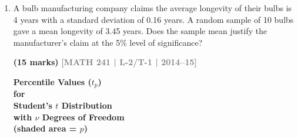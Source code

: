\documentclass[12pt,a4paper]{article}
\newcommand{\yr}[1]{\hfill\textcolor{gray}{\small\textbf{[#1]}}}
\newcommand{\mk}[1]{\textcolor{orange!70!black}{\small\textbf{(#1 marks)}}}
\begin{document}
\begin{enumerate}
\item A bulb manufacturing company claims the average longevity of their bulbs is 4 years with a standard deviation of 0.16 years. A random sample of 10 bulbs gave a mean longevity of 3.45 years. Does the sample mean justify the manufacturer's claim at the 5\% level of significance?

\mk{15} \yr{MATH 241 | L-2/T-1 | 2014--15}


\begin{center}
\begin{minipage}{0.45\textwidth}
    \centering
    \textbf{\large Percentile Values ($t_p$)} \\
    \vspace{0.2cm}
    \textbf{for} \\
    \vspace{0.2cm}
    \textbf{Student's $t$ Distribution} \\
    \vspace{0.2cm}
    \textbf{with $\nu$ Degrees of Freedom} \\
    \vspace{0.2cm}
    \textbf{(shaded area = $p$)}
\end{minipage}
\hfill
\begin{minipage}{0.45\textwidth}
    \centering
\end{minipage}
\end{center}
\vspace{0.5cm}


\end{enumerate}
\end{document}
